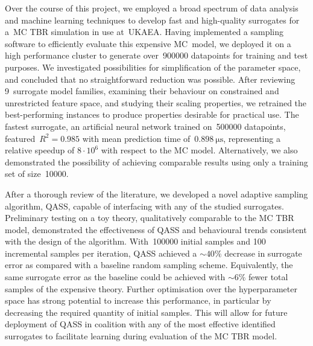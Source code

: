 
Over the course of this project, we employed a broad spectrum of data
analysis and machine learning techniques to develop fast and high-quality
surrogates for a~MC TBR simulation in use at~UKAEA. Having implemented a sampling
software to efficiently evaluate this expensive MC~model, we deployed it on a
high performance cluster to generate over~\num{900000}
datapoints for training and test purposes. We
investigated possibilities for simplification of the parameter space, and
concluded that no straightforward reduction was possible. After reviewing
9~surrogate model families, examining their behaviour on constrained and
unrestricted feature space, and studying their scaling properties, we retrained
the best-performing instances to produce properties desirable for
practical use. The fastest surrogate, an artificial neural network trained
on~\num{500000} datapoints, featured~$R^2=\num{0.985}$ with mean prediction time
of~$\SI{0.898}{\micro\second}$, representing a relative
speedup of $8\cdot 10^6$ with respect to the MC model. Alternatively, we
also demonstrated the possibility of achieving comparable results using only a
training set of size~\num{10000}.

After a thorough review of the literature, we developed a novel adaptive
sampling algorithm, QASS, capable of interfacing with any of the studied
surrogates. Preliminary testing on a toy theory, qualitatively comparable to
the MC TBR model, demonstrated the effectiveness of QASS and behavioural trends
consistent with the design of the algorithm. With~\num{100000} initial samples and 100 incremental samples per iteration, QASS achieved a ${\sim}40\%$ decrease in surrogate error as compared with a baseline random sampling scheme. Equivalently, the same surrogate error as the baseline could be achieved with ${\sim}6\%$ fewer total samples of the expensive theory. Further optimisation over the hyperparameter space has strong
potential to increase this performance, in particular by decreasing the required quantity of initial samples. This will allow for future deployment of QASS
in coalition with any of the most effective identified surrogates to facilitate
learning during evaluation of the MC TBR model.

